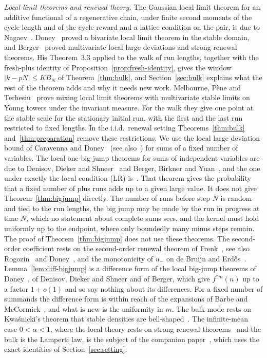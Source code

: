 \emph{Local limit theorems and renewal theory.} The Gaussian local limit theorem for an
additive functional of a regenerative chain, under finite second moments of the cycle length
and of the cycle reward and a lattice condition on the pair, is due to
Nagaev~\cite{nagaev1963}. Doney~\cite{doney1991} proved a bivariate
local limit theorem in the stable domain, and Berger~\cite{berger2019} proved multivariate
local large deviations and strong renewal theorems. His Theorem~3.3 applied to the walk of
run lengths, together with the fresh-plus identity of Proposition~\ref{prop:fresh-identity},
gives the window $|k-pN|\le KB_N$ of Theorem~\ref{thm:bulk}, and Section~\ref{sec:bulk}
explains what the rest of the theorem adds and why it needs new work. Melbourne, P\`ene and
Terhesiu~\cite{mpt2026} prove mixing local limit theorems with multivariate stable limits on
Young towers under the invariant measure. For the walk they give one point at the stable
scale for the stationary initial run, with the first and the last run restricted to fixed
lengths. In the i.i.d.\ renewal setting Theorems~\ref{thm:bulk} and~\ref{thm:preparation}
remove these restrictions. We use the local large deviation bound of Caravenna and
Doney~\cite{caravennadoney2019} (see also~\cite{melbourneterhesiu2022}) for sums of a fixed
number of variables. The local one-big-jump theorems for sums of independent variables are
due to Denisov, Dieker and Shneer~\cite{dds2008} and Berger, Birkner and Yuan~\cite{bby2023},
and the one under exactly the local condition (LR) is~\cite[Theorem~2.4]{berger2019ptrf}.
That theorem gives the probability that a fixed number of plus runs adds up to a given large
value. It does not give Theorem~\ref{thm:bigjump} directly. The number of runs before step
$N$ is random and tied to the run lengths, the big jump may be made by the run in progress
at time $N$, which no statement about complete sums sees, and the kernel must hold uniformly
up to the endpoint, where only boundedly many minus steps remain. The proof of
Theorem~\ref{thm:bigjump} does not use these theorems. The second-order coefficient rests on
the second-order renewal theorem of Frenk~\cite{frenk1982}, see also
Rogozin~\cite{rogozin1973} and Doney~\cite{doney2023}, and the monotonicity of $u_\minus$ on de
Bruijn and Erd\H{o}s~\cite{debruijnerdos1953}. Lemma~\ref{lem:diff-bigjump} is a difference
form of the local big-jump theorems of Doney~\cite{doney1989}, of Denisov, Dieker and Shneer
and of Berger, which give $f^{*m}(n)$ up to a factor $1+o(1)$ and so say nothing about its
differences. For a fixed number of summands the difference form is within reach of the
expansions of Barbe and McCormick~\cite{barbemccormick2009}, and what is new is the uniformity
in $m$. The bulk mode rests on Kwa\'snicki's theorem that stable densities are
bell-shaped~\cite{kwasnicki2020}. The infinite-mean case $0<\alpha<1$, where the local theory
rests on strong renewal theorems~\cite{doney1997,caravennadoney2019} and the bulk is the
Lamperti law, is the subject of the companion paper~\cite{paperG}, which uses the exact
identities of Section~\ref{sec:setting}.

